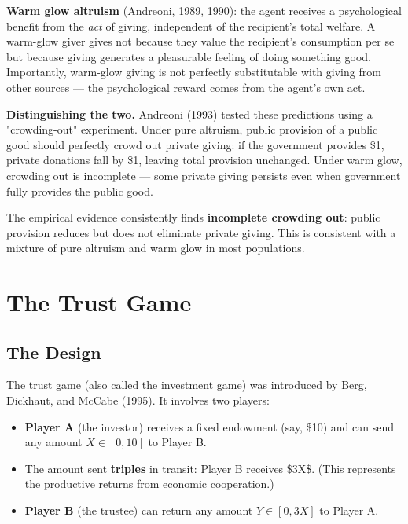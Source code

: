 \documentclass[12pt, letterpaper]{article}
\begin{document}
\textbf{Warm glow altruism} (Andreoni, 1989, 1990): the agent receives a psychological benefit from the \textit{act} of giving, independent of the recipient's total welfare. A warm-glow giver gives not because they value the recipient's consumption per se but because giving generates a pleasurable feeling of doing something good. Importantly, warm-glow giving is not perfectly substitutable with giving from other sources --- the psychological reward comes from the agent's own act.

\textbf{Distinguishing the two.} Andreoni (1993) tested these predictions using a "crowding-out" experiment. Under pure altruism, public provision of a public good should perfectly crowd out private giving: if the government provides \$1, private donations fall by \$1, leaving total provision unchanged. Under warm glow, crowding out is incomplete --- some private giving persists even when government fully provides the public good.

The empirical evidence consistently finds \textbf{incomplete crowding out}: public provision reduces but does not eliminate private giving. This is consistent with a mixture of pure altruism and warm glow in most populations.

\medskip


\section{The Trust Game}



\subsection{The Design}


The trust game (also called the investment game) was introduced by Berg, Dickhaut, and McCabe (1995). It involves two players:

\begin{itemize}
\item \textbf{Player A} (the investor) receives a fixed endowment (say, \$10) and can send any amount $X \in [0, 10]$ to Player B.
\item The amount sent \textbf{triples} in transit: Player B receives \$3X\$. (This represents the productive returns from economic cooperation.)
\item \textbf{Player B} (the trustee) can return any amount $Y \in [0, 3X]$ to Player A.
\end{itemize}
\end{document}
